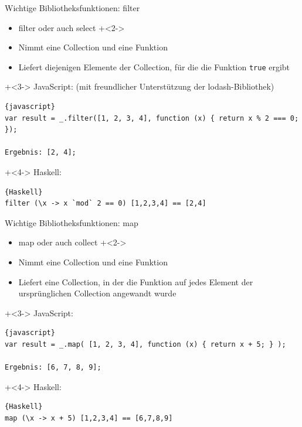 \begin{frame}[fragile]{Wichtige Bibliotheksfunktionen: filter}
\begin{itemize}
\item filter oder auch select
\onslide+<2->
\item Nimmt eine Collection und eine Funktion
\item Liefert diejenigen Elemente der Collection, für die die Funktion \texttt{true} ergibt
\end{itemize}

\onslide+<3->
JavaScript: (mit freundlicher Unterstützung der lodash-Bibliothek)
\begin{lstlisting}{javascript}
var result = _.filter([1, 2, 3, 4], function (x) { return x % 2 === 0; });
    
Ergebnis: [2, 4];
\end{lstlisting}
\onslide+<4->
Haskell:
\begin{lstlisting}{Haskell}
filter (\x -> x `mod` 2 == 0) [1,2,3,4] == [2,4]
\end{lstlisting}

\end{frame}


\begin{frame}[fragile]{Wichtige Bibliotheksfunktionen: map}
\begin{itemize}
\item map oder auch collect
\onslide+<2->
\item Nimmt eine Collection und eine Funktion
\item Liefert eine Collection, in der die Funktion auf jedes Element der ursprünglichen Collection angewandt wurde
\end{itemize}

\onslide+<3->
JavaScript:
\begin{lstlisting}{javascript}
var result = _.map( [1, 2, 3, 4], function (x) { return x + 5; } );

Ergebnis: [6, 7, 8, 9];
\end{lstlisting}
\onslide+<4->
Haskell:
\begin{lstlisting}{Haskell}
map (\x -> x + 5) [1,2,3,4] == [6,7,8,9]
\end{lstlisting}

\end{frame}

